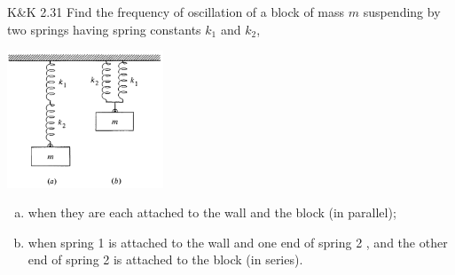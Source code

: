 \documentclass{esg8012pset}
\begin{document}
\begin{problem}{K\&K 2.31}
  Find the frequency of oscillation of a block of mass $m$ suspending by two springs having spring constants $k_1$ and $k_2$,
  \begin{center}\includegraphics[width=0.35\textwidth]{ps03_4}\end{center}
  \begin{enumerate}[a)]
    \item when they are each attached to the wall and the block (in parallel);
    \item when spring 1 is attached to the wall and one end of spring 2 , and the other end of spring 2 is attached to the block (in series).
  \end{enumerate}
\end{problem}
\end{document}
